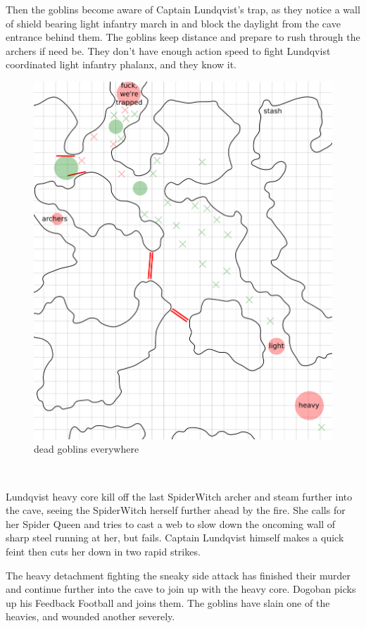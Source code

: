 Then the goblins become aware of Captain Lundqvist's trap, as they notice a wall of shield bearing light infantry march in and block the daylight from the cave entrance behind them. The goblins keep distance and prepare to rush through the archers if need be. They don't have enough action speed to fight Lundqvist coordinated light infantry phalanx, and they know it.


\begin{figure}    %
\centering
\includegraphics[width=0.9\linewidth]{./fig/hool2lundqvistresult3-zoom.png}
\caption*{dead goblins everywhere}
\end{figure}

\

Lundqvist heavy core kill off the last SpiderWitch archer and steam further into the cave, seeing the SpiderWitch herself further ahead by the fire. She calls for her Spider Queen and tries to cast a web to slow down the oncoming wall of sharp steel running at her, but fails. Captain Lundqvist himself makes a quick feint then cuts her down in two rapid strikes.

The heavy detachment fighting the sneaky side attack has finished their murder and continue further into the cave to join up with the heavy core. Dogoban picks up his Feedback Football and joins them. The goblins have slain one of the heavies, and wounded another severely.

